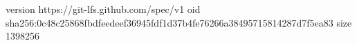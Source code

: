 version https://git-lfs.github.com/spec/v1
oid sha256:0c48c25868fbdfeedeef36945fdf1d37b4fe76266a38495715814287d7f5ea83
size 1398256
